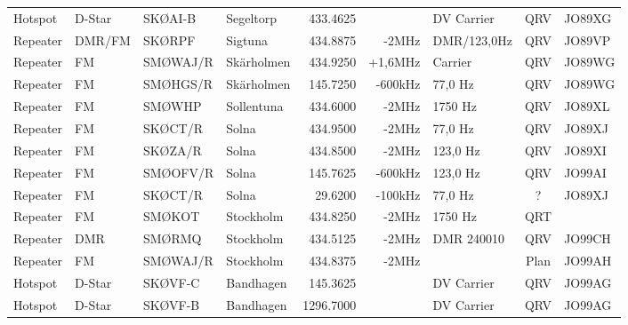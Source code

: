 \begin{landscape}
\begin{longtable}{llllrrlcl}
	Hotspot            & D-Star       & SKØAI-B       & Segeltorp    &          433.4625 &                & DV Carrier      &       QRV       & JO89XG           \\
	Repeater           & DMR/FM       & SKØRPF        & Sigtuna      &          434.8875 &          -2MHz & DMR/123,0Hz     &       QRV       & JO89VP           \\
	Repeater           & FM           & SMØWAJ/R      & Skärholmen   &          434.9250 &        +1,6MHz & Carrier         &       QRV       & JO89WG           \\
	Repeater           & FM           & SMØHGS/R      & Skärholmen   &          145.7250 &        -600kHz & 77,0 Hz         &       QRV       & JO89WG           \\
	Repeater           & FM           & SMØWHP        & Sollentuna   &          434.6000 &          -2MHz & 1750 Hz         &       QRV       & JO89XL           \\
	Repeater           & FM           & SKØCT/R       & Solna        &          434.9500 &          -2MHz & 77,0 Hz         &       QRV       & JO89XJ           \\
	Repeater           & FM           & SKØZA/R       & Solna        &          434.8500 &          -2MHz & 123,0 Hz        &       QRV       & JO89XI           \\
	Repeater           & FM           & SMØOFV/R      & Solna        &          145.7625 &        -600kHz & 123,0 Hz        &       QRV       & JO99AI           \\
	Repeater           & FM           & SKØCT/R       & Solna        &           29.6200 &        -100kHz & 77,0 Hz         &        ?        & JO89XJ           \\
	Repeater           & FM           & SMØKOT        & Stockholm    &          434.8250 &          -2MHz & 1750 Hz         &       QRT       &  \\
	Repeater           & DMR          & SMØRMQ        & Stockholm    &          434.5125 &          -2MHz & DMR 240010      &       QRV       & JO99CH           \\
	Repeater           & FM           & SMØWAJ/R      & Stockholm    &          434.8375 &          -2MHz &                 &      Plan       & JO99AH           \\
	Hotspot            & D-Star       & SKØVF-C       & Bandhagen    &          145.3625 &                & DV Carrier      &       QRV       & JO99AG           \\
	Hotspot            & D-Star       & SKØVF-B       & Bandhagen    &         1296.7000 &                & DV Carrier      &       QRV       & JO99AG           \\

\end{longtable}
\end{landscape}
